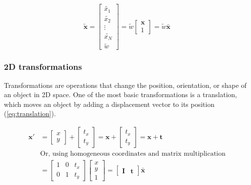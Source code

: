 \begin{equation}
    \tilde{\mathbf{x}} = \begin{bmatrix}
        \tilde{x_1} \\ \tilde{x_2} \\ \vdots \\ \tilde{x_N} \\ \tilde{w}
    \end{bmatrix} = \tilde{w}\begin{bmatrix}
        \mathbf{x}\\ 1
    \end{bmatrix} = \tilde{w}\bar{\mathbf{x}}
    \label{eq:homog-point}
\end{equation}

\subsubsection{2D transformations}
\label{sec:2d-transformations}
Transformations are operations that change the position, orientation, or shape of an object in 2D space. One of the most basic transformations is a translation, which moves an object by adding a displacement vector to its position (\cref{eq:translation}).

\begin{equation}
    \begin{aligned}
        \mathbf{x'} &= \begin{bmatrix}
            x  \\ y 
        \end{bmatrix} + \begin{bmatrix}
            t_x \\ t_y
        \end{bmatrix} = \mathbf{x} + \begin{bmatrix}
            t_x \\ t_y
        \end{bmatrix} = \mathbf{x} + \mathbf{t}\\
        &\text{Or, using homogeneous coordinates and matrix multiplication} \\
        &= \begin{bmatrix}
            1 & 0 & t_x \\ 0 & 1 & t_y
        \end{bmatrix} \begin{bmatrix}
            x \\ y \\ 1
        \end{bmatrix} = \begin{bmatrix}
            \mathbf{I} & \mathbf{t}
        \end{bmatrix}\bar{\mathbf{x}} \\
    \end{aligned}
    \label{eq:translation}
\end{equation}

